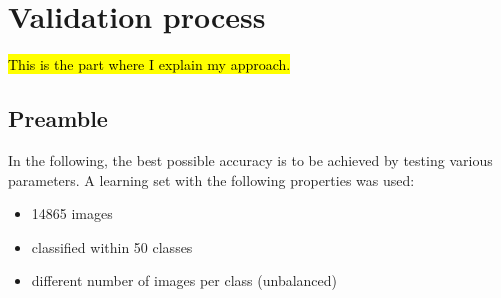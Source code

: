 \documentclass[10pt]{article}
\newcommand*{\fullref}[1]{\hyperref[{#1}]{\autoref*{#1}: \nameref*{#1}}}
\newif\ifen
\newif\ifde
\newcommand{\en}[1]{\ifen#1\fi}
\newcommand{\de}[1]{\ifde#1\fi}
\begin{document}
		\de{Diese Arbeit beschäftigt sich mit dem Bildklassifizierungsteil. Da es sich hierbei um Unternehmen mit begrenzten Ressourcen handelt, steht nun die Frage im Raum: Mit welchen Mitteln, Techniken und Kniffen ist es möglich dennoch eine erfolgreiche Bildklassifizierung durchzuführen. Müssen die in \fullref{sec:section_insufficient_amount_of_data} erwähnten Bedingungen erfüllt werden oder sind erfolgreiche Klassifizierungen auch schon mit weniger möglich? Kann man durch Anpassung bestimmter Abstimmungsparameter das Optimum aus der Erstellung von Modellen herausholen? Ist z.B. eine Clusteranalyse und die damit verbundene kategorische Untergliederung der Klassifizierung ein erfolgreicher Ansatz? Diese und andere Fragen sollen mit dieser Arbeit geklärt werden. Und ich wage an dieser Stelle zu behaupten, dass es möglich ist auch mit weniger Anforderungen zu einem guten Ziel zu kommen.}
		\en{This thesis deals with the image classification part. Since these are companies with limited resources, the question is: With which tools, techniques and tricks is it possible to carry out a successful image classification. Do the conditions mentioned in \fullref{sec:section_insufficient_amount_of_data} have to be fulfilled or are successful classifications already possible with less? Is it possible to get the most out of model creation by adjusting certain tuning parameters? For example, is a cluster analysis and the associated categorical breakdown of the classification a successful approach? These and other questions are to be clarified with this thesis. And I dare to say at this point that it is possible to reach a good goal even with fewer requirements.}



	\section{Validation process}

		\hl{This is the part where I explain my approach.}
	
		\subsection{Preamble}
			In the following, the best possible accuracy is to be achieved by testing various parameters.
			A learning set with the following properties was used:
	
			\begin{itemize}
				\item 14865 images
				\item classified within 50 classes
				\item different number of images per class (unbalanced)
			\end{itemize}
	
\end{document}
